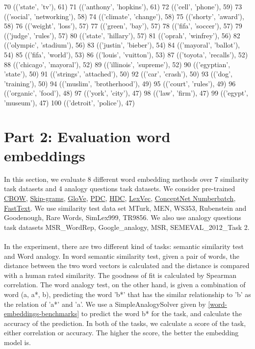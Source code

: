 \documentclass[a4paper, 11pt]{article}
\begin{document}
\begin{spverbatim}
70 (('state', 'tv'), 61)
71 (('anthony', 'hopkins'), 61)
72 (('cell', 'phone'), 59)
73 (('social', 'networking'), 58)
74 (('climate', 'change'), 58)
75 (('shorty', 'award'), 58)
76 (('weight', 'loss'), 57)
77 (('green', 'bay'), 57)
78 (('fifa', 'soccer'), 57)
79 (('judge', 'rules'), 57)
80 (('state', 'hillary'), 57)
81 (('oprah', 'winfrey'), 56)
82 (('olympic', 'stadium'), 56)
83 (('justin', 'bieber'), 54)
84 (('mayoral', 'ballot'), 54)
85 (('fifa', 'world'), 53)
86 (('louis', 'vuitton'), 53)
87 (('toyota', 'recalls'), 52)
88 (('chicago', 'mayoral'), 52)
89 (('illinois', 'supreme'), 52)
90 (('egyptian', 'state'), 50)
91 (('strings', 'attached'), 50)
92 (('car', 'crash'), 50)
93 (('dog', 'training'), 50)
94 (('muslim', 'brotherhood'), 49)
95 (('court', 'rules'), 49)
96 (('organic', 'food'), 48)
97 (('york', 'city'), 47)
98 (('law', 'firm'), 47)
99 (('egypt', 'museum'), 47)
100 (('detroit', 'police'), 47)	
\end{spverbatim}
\section{Part 2: Evaluation word embeddings}
In this section, we evaluate 8 different word embedding methods over 7 similarity task datasets and 4 analogy questions task datasets. We consider pre-trained  \href{https://github.com/eleriaedmaa/embeddings}{CBOW},      \href{https://code.google.com/p/word2vec/}{Skip-grams}, \href{https://nlp.stanford.edu/projects/glove/}{GloVe}, \href{http://ofey.me/projects/wordrep/}{PDC}, \href{http://ofey.me/projects/wordrep/}{HDC}, \href{https://github.com/alexandres/lexvec}{LexVec}, \href{https://github.com/commonsense/ConceptNet Numberbatch-numberbatch}{ConceptNet Numberbatch}, \href{https://fasttext.cc/docs/en/english-vectors.html}{FastText}. We use similarity test data set MTurk, MEN, WS353, Rubenstein and Goodenough, Rare Words, SimLex999, TR9856. We also use analogy questions task datasets MSR\_WordRep, Google\_analogy, MSR, SEMEVAL\_2012\_Task 2.
\\ \hspace*{\fill} \\
\noindent In the experiment, there are two different kind of tasks: semantic similarity test and Word analogy. In word semantic similarity test, given a pair of words, the distance between the two word vectors is calculated and the distance is compared with a human rated similarity. The goodness of fit is calculated by Spearman correlation. The word analogy test, on the other hand, is given a combination of word (a, a*, b), predicting the word 'b*' that has the similar relationship to 'b' as the relation of 'a*' and 'a'. We use a SimpleAnalogySolver given by \href{https://github.com/kudkudak/word-embeddings-benchmarks/blob/master/web/analogy.py}{[word-embeddings-benchmarks]} to predict the word b* for the task, and calculate the accuracy of the prediction. In both of the tasks, we calculate a score of the task, either correlation or accuracy. The higher the score, the better the embedding model is.
\end{document}
